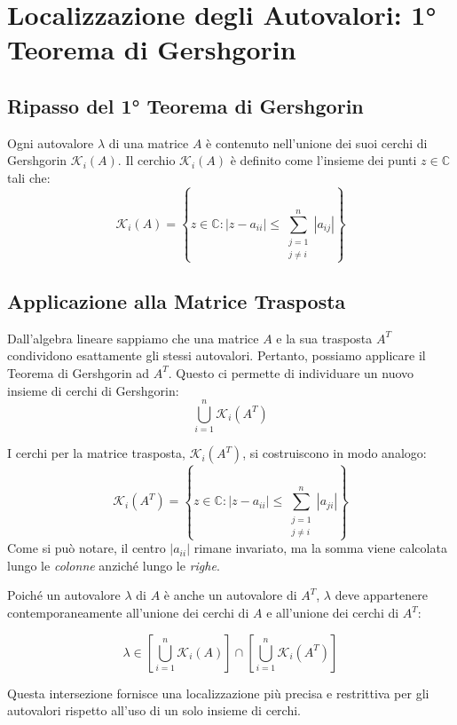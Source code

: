 \documentclass[a4paper,12pt]{article}
\begin{document}
	\section{Localizzazione degli Autovalori: 1° Teorema di Gershgorin}
	
	\subsection{Ripasso del 1° Teorema di Gershgorin}
	Ogni autovalore $\lambda$ di una matrice $A$ è contenuto nell'unione dei suoi cerchi di Gershgorin $\mathcal{K}_i(A)$.
	Il cerchio $\mathcal{K}_i(A)$ è definito come l'insieme dei punti $z \in \mathbb{C}$ tali che:
	\begin{equation}
		\mathcal{K}_i(A) = \left\{ z \in \mathbb{C} : |z - a_{ii}| \le \sum_{\substack{j=1 \\ j \neq i}}^{n} |a_{ij}| \right\}
	\end{equation}
	
	\subsection{Applicazione alla Matrice Trasposta}
	Dall'algebra lineare sappiamo che una matrice $A$ e la sua trasposta $A^T$ condividono esattamente gli stessi autovalori. Pertanto, possiamo applicare il Teorema di Gershgorin ad $A^T$. Questo ci permette di individuare un nuovo insieme di cerchi di Gershgorin:
	\[
	\bigcup_{i=1}^{n} \mathcal{K}_i(A^T)
	\]
	
	I cerchi per la matrice trasposta, $\mathcal{K}_i(A^T)$, si costruiscono in modo analogo:
	\begin{equation}
		\mathcal{K}_i(A^T) = \left\{ z \in \mathbb{C} : |z - a_{ii}| \le \sum_{\substack{j=1 \\ j \neq i}}^{n} |a_{ji}| \right\}
	\end{equation}
	Come si può notare, il centro $|a_{ii}|$ rimane invariato, ma la somma viene calcolata lungo le \textit{colonne} anziché lungo le \textit{righe}.
	
	Poiché un autovalore $\lambda$ di $A$ è anche un autovalore di $A^T$, $\lambda$ deve appartenere contemporaneamente all'unione dei cerchi di $A$ e all'unione dei cerchi di $A^T$:
	\begin{tcolorbox}[colback=yellow!5!white, colframe=yellow!50!black]
		\begin{equation}
			\lambda \in \left[ \bigcup_{i=1}^{n} \mathcal{K}_i(A) \right] \cap \left[ \bigcup_{i=1}^{n} \mathcal{K}_i(A^T) \right]
		\end{equation}
	\end{tcolorbox}
	Questa intersezione fornisce una localizzazione più precisa e restrittiva per gli autovalori rispetto all'uso di un solo insieme di cerchi.
	
\end{document}
